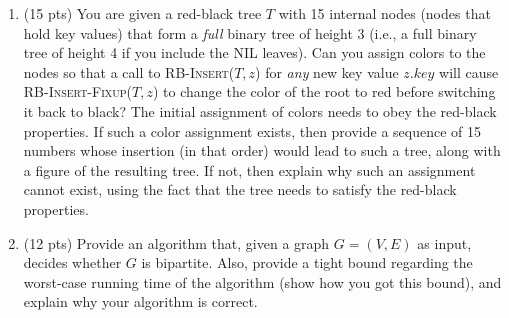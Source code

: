 \documentclass{article}
\begin{document}
\begin{enumerate}
\newpage

\item (15 pts) You are given a red-black tree $T$ with 15 internal nodes (nodes that hold key values) 
that form a \emph{full} binary tree of height 3 (i.e., a full binary tree of height 4 if you include 
the NIL leaves). Can you assign colors to the nodes so that a call to \textsc{RB-Insert}($T,z$) for
\emph{any} new key value $z.key$ will cause \textsc{RB-Insert-Fixup}($T,z$) to change the color of the 
root to red before switching it back to black? The initial assignment of colors needs to obey the 
red-black properties. If such a color assignment exists, then provide a sequence of 15 numbers whose 
insertion (in that order) would lead to such a tree, along with a figure of the resulting tree. If not, 
then explain why such an assignment cannot exist, using the fact that the tree needs to satisfy the 
red-black properties.

\item (12 pts) Provide an algorithm that, given a graph $G=(V,E)$ as input, decides whether $G$ is
bipartite. Also, provide a tight bound regarding the worst-case running time of the algorithm (show
how you got this bound), and explain why your algorithm is correct.


\end{enumerate}
\end{document}
